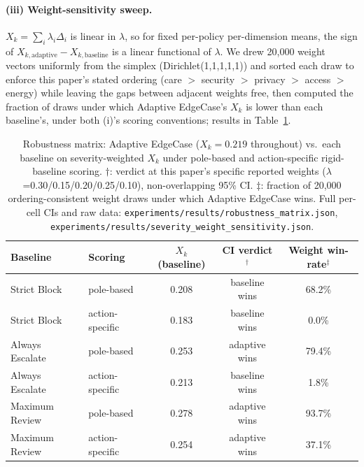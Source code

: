 \documentclass[letterpaper]{article} %
\begin{document}
\paragraph{(iii) Weight-sensitivity sweep.} $X_k = \sum_i \lambda_i \Delta_i$ is linear in $\lambda$, so for fixed per-policy per-dimension means, the sign of $X_{k,\text{adaptive}} - X_{k,\text{baseline}}$ is a linear functional of $\lambda$. We drew 20,000 weight vectors uniformly from the simplex (Dirichlet(1,1,1,1,1)) and sorted each draw to enforce this paper's stated ordering (care $>$ security $>$ privacy $>$ access $>$ energy) while leaving the gaps between adjacent weights free, then computed the fraction of draws under which Adaptive EdgeCase's $X_k$ is lower than each baseline's, under both (i)'s scoring conventions; results in Table~\ref{tab:robustness-matrix}.

\begin{table}[h]
\centering
\scriptsize
\setlength{\tabcolsep}{3pt}
\begin{tabular}{llccc}
\toprule
Baseline & Scoring & $X_k$ (baseline) & CI verdict$^\dagger$ & Weight win-rate$^\ddagger$ \\
\midrule
Strict Block & pole-based & 0.208 & baseline wins & 68.2\% \\
Strict Block & action-specific & 0.183 & baseline wins & 0.0\% \\
\midrule
Always Escalate & pole-based & 0.253 & adaptive wins & 79.4\% \\
Always Escalate & action-specific & 0.213 & baseline wins & 1.8\% \\
\midrule
Maximum Review & pole-based & 0.278 & adaptive wins & 93.7\% \\
Maximum Review & action-specific & 0.254 & adaptive wins & 37.1\% \\
\bottomrule
\end{tabular}
\caption{Robustness matrix: Adaptive EdgeCase ($X_k = 0.219$ throughout) vs.\ each baseline on severity-weighted $X_k$ under pole-based and action-specific rigid-baseline scoring. $\dagger$: verdict at this paper's specific reported weights ($\lambda$=0.30/0.15/0.20/0.25/0.10), non-overlapping 95\% CI. $\ddagger$: fraction of 20,000 ordering-consistent weight draws under which Adaptive EdgeCase wins. Full per-cell CIs and raw data: \texttt{experiments/results/robustness\_matrix.json}, \texttt{experiments/results/severity\_weight\_sensitivity.json}.}
\label{tab:robustness-matrix}
\end{table}
\end{document}
